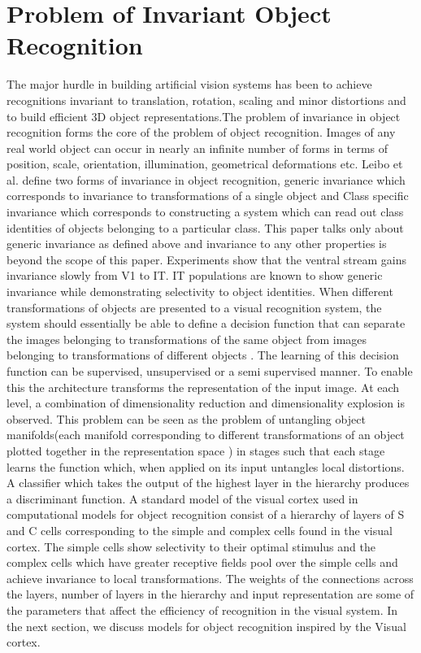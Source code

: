 \documentclass[12pt,twoside]{article}
\theoremstyle{plain}
\theoremstyle{definition}
\theoremstyle{remark}
\begin{document}
\section{Problem of Invariant Object Recognition}
\label{sec:objectrecognition}
The major hurdle in building artificial vision systems has been to achieve recognitions invariant to translation, rotation, scaling and minor distortions and to build efficient 3D object representations.The problem of invariance in object recognition forms the core of the problem of object recognition\cite{JamesJ.DiCarlo2007}. Images of any real world object can occur in nearly an infinite number of forms in terms of position, scale, orientation, illumination, geometrical deformations etc\cite{NicolasPinto2008}. Leibo et al.\cite{rohtua} define two forms of invariance in object recognition, generic invariance which corresponds to invariance to transformations of a single object and Class specific invariance which corresponds to constructing a system which can read out class identities of objects belonging to a particular class. This paper talks only about generic invariance as defined above\cite{rohtua} and invariance to any other properties is beyond the scope of this paper. Experiments show that the ventral stream gains invariance slowly from V1 to IT. IT populations are known to show generic invariance while demonstrating selectivity to object identities\cite{HungCP2005}. When different transformations of objects are presented to a visual recognition system, the system should essentially be able to define a decision function that can separate the images belonging to transformations of the same object from images belonging to transformations of different objects\cite{AshbyFG1988} . The learning of this decision function can be supervised, unsupervised or a semi supervised manner. To enable this the architecture transforms the representation of the input image. At each level, a combination of dimensionality reduction and dimensionality explosion is observed\cite{JamesJ.DiCarlo2007}. This problem can be seen as the problem of untangling object manifolds\cite{JamesJ.DiCarlo2007}(each manifold corresponding to different transformations of an object plotted together in the representation space \cite{Edelm1999}) in stages such that each stage learns the function which, when applied on its input untangles local distortions. A classifier which takes the output of the highest layer in the hierarchy produces a discriminant function. A standard model of the visual cortex used in computational models for object recognition consist of a hierarchy of layers of S and C cells corresponding to the simple and complex cells\cite{D.H.Hubel1977} found in the visual cortex. The simple cells show selectivity to their optimal stimulus and the complex cells which have greater receptive fields pool over the simple cells and achieve invariance to local transformations. The weights of the connections across the layers, number of layers in the hierarchy and input representation are some of the parameters that affect the efficiency of recognition in the visual system. In the next section, we discuss models for object recognition inspired by the Visual cortex.
\end{document}
